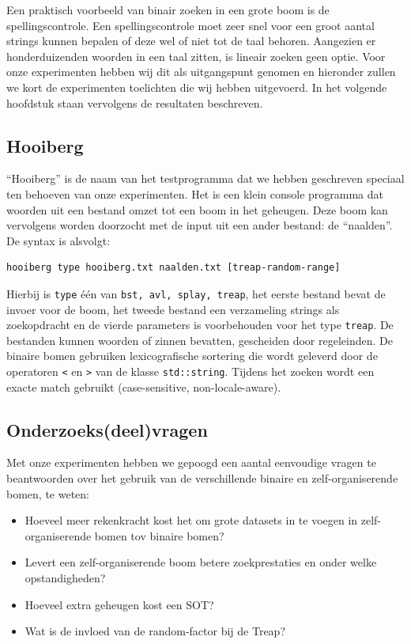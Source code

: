 \documentclass[a4paper,10pt]{article}
\begin{document}
Een praktisch voorbeeld van binair zoeken in een grote boom is de spellingscontrole. Een spellingscontrole moet zeer snel voor een groot aantal strings kunnen bepalen of deze wel of niet tot de taal behoren. Aangezien er honderduizenden woorden in een taal zitten, is
lineair zoeken geen optie. Voor onze experimenten hebben wij dit als uitgangspunt genomen en hieronder zullen we kort de experimenten toelichten die wij hebben uitgevoerd. In het volgende hoofdstuk staan vervolgens de resultaten beschreven.

\subsection{Hooiberg}

``Hooiberg'' is de naam van het testprogramma dat we hebben geschreven speciaal ten behoeven van onze experimenten.
Het is een klein console programma dat woorden uit een bestand omzet tot een boom in het geheugen. 
Deze boom kan vervolgens worden doorzocht met de input uit een ander bestand: de ``naalden''.
De syntax is alsvolgt:
\begin{verbatim}
hooiberg type hooiberg.txt naalden.txt [treap-random-range]
\end{verbatim}
Hierbij is \texttt{type} \'e\'en van \texttt{bst, avl, splay, treap}, het eerste bestand bevat de invoer voor de boom, het tweede bestand een verzameling strings als zoekopdracht en de vierde parameters is voorbehouden voor het type \texttt{treap}.
De bestanden kunnen woorden of zinnen bevatten, gescheiden door regeleinden. De binaire bomen gebruiken lexicografische sortering 
die wordt geleverd door de operatoren \texttt{<} en \texttt{>} van de klasse \texttt{std::string}. Tijdens het zoeken wordt een
exacte match gebruikt (case-sensitive, non-locale-aware).

\subsection{Onderzoeks(deel)vragen}

Met onze experimenten hebben we gepoogd een aantal eenvoudige vragen te beantwoorden over het gebruik van de verschillende
binaire en zelf-organiserende bomen, te weten:

\begin{itemize}
\item Hoeveel meer rekenkracht kost het om grote datasets in te voegen in zelf-organiserende bomen tov binaire bomen?
\item Levert een zelf-organiserende boom betere zoekprestaties en onder welke opstandigheden?
\item Hoeveel extra geheugen kost een SOT?
\item Wat is de invloed van de random-factor bij de Treap?
\end{itemize}
\end{document}

